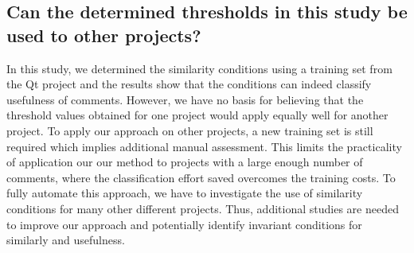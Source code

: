 \subsection{Can the determined thresholds in this study be used to other projects?}

In this study, we determined the similarity conditions using a training set from the Qt project and the results show that the conditions can indeed classify usefulness of comments.
However, we have no basis for believing that the threshold values obtained for one project would apply equally well for another project. To apply our approach on other projects, a new training set is still required which implies additional manual assessment.
This limits the practicality of application our our method to projects with a large enough number of comments, where the classification effort saved overcomes the training costs.
To fully automate this approach, we have to investigate the use of similarity conditions for many other different projects. Thus, additional studies are needed to improve our approach and potentially identify invariant conditions for similarly and usefulness. 

%



